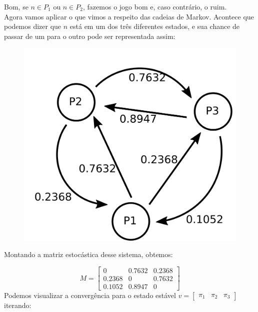 \documentclass[12pt]{article}
\begin{document}
Bom, se $n \in P_1$ ou $n \in P_2$, fazemos o jogo bom e, caso contrário, o ruim.\\
Agora vamos aplicar o que vimos a respeito das cadeias de Markov. Acontece que podemos dizer que $n$ está em um dos três diferentes estados, e sua chance de passar de um para o outro pode ser representada assim:

\begin{figure}[H]
\centering
\includegraphics[scale=0.7]{fig3.png}
\end{figure}

Montando a matriz estocástica desse sistema, obtemos:

$$
M = 
\begin{bmatrix}
0 & 0.7632 & 0.2368\\
0.2368 & 0 & 0.7632\\
0.1052 & 0.8947 & 0
\end{bmatrix}
$$
Podemos visualizar a convergência para o estado estável $v = \begin{bmatrix} \pi_1 & \pi_2 & \pi_3 \end{bmatrix} $ iterando:
\end{document}
